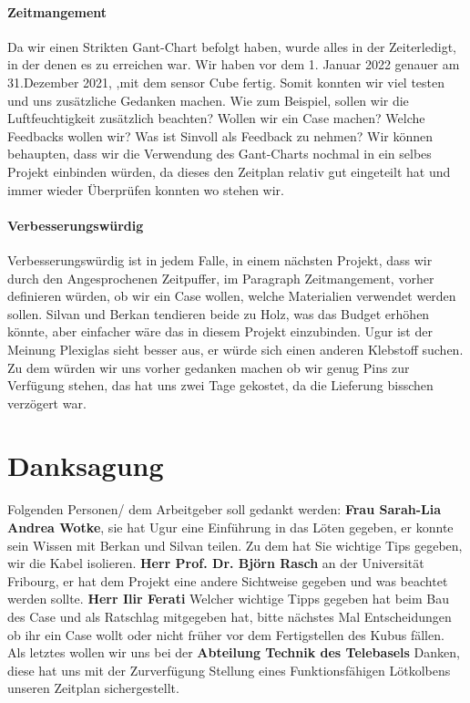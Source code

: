 \documentclass{article}
\newlength\mylength
\begin{document}
\begin{table}
\begin{tabular}{p{\mylength}|p{\mylength}|p{\mylength}}
        \hline
    \end{tabular}
    \label{table: simulation parameters}
\end{table}

\newpage
\paragraph{Zeitmangement}
Da wir einen Strikten Gant-Chart befolgt haben, wurde alles in der Zeiterledigt, in der denen es zu erreichen war. Wir haben vor dem 1. Januar 2022 genauer am 31.Dezember 2021, ,mit dem sensor Cube fertig. Somit konnten wir viel testen und uns zusätzliche Gedanken machen. Wie zum Beispiel, sollen wir die Luftfeuchtigkeit zusätzlich beachten? Wollen wir ein Case machen? Welche Feedbacks wollen wir? Was ist Sinvoll als Feedback zu nehmen? Wir können behaupten, dass wir die Verwendung des Gant-Charts nochmal in ein selbes Projekt einbinden würden, da dieses den Zeitplan relativ gut eingeteilt hat und immer wieder Überprüfen konnten wo stehen wir.  
\paragraph{Verbesserungswürdig}
Verbesserungswürdig ist in jedem Falle, in einem nächsten Projekt, dass wir durch den Angesprochenen Zeitpuffer, im Paragraph Zeitmangement, vorher definieren würden, ob wir ein Case wollen, welche Materialien verwendet werden sollen. Silvan und Berkan tendieren beide zu Holz, was das Budget erhöhen könnte, aber einfacher wäre das in diesem Projekt einzubinden. Ugur ist der Meinung Plexiglas sieht besser aus, er würde sich einen anderen Klebstoff suchen. Zu dem würden wir uns vorher gedanken machen ob wir genug Pins zur Verfügung stehen, das hat uns zwei Tage gekostet, da die Lieferung bisschen verzögert war. 

\section{Danksagung}
Folgenden Personen/ dem Arbeitgeber soll gedankt werden:
\newline \textbf{Frau Sarah-Lia Andrea Wotke}, sie hat Ugur eine Einführung in das Löten gegeben, er konnte sein Wissen mit Berkan und Silvan teilen. Zu dem hat Sie wichtige Tips gegeben, wir die Kabel isolieren. \newline
\textbf{Herr Prof. Dr. Björn Rasch} an der Universität Fribourg, er hat dem Projekt eine andere Sichtweise gegeben und was beachtet werden sollte.\newline
\textbf{Herr Ilir Ferati} Welcher wichtige Tipps gegeben hat beim Bau des Case und als Ratschlag mitgegeben hat, bitte nächstes Mal Entscheidungen ob ihr ein Case wollt oder nicht früher vor dem Fertigstellen des Kubus fällen.\newline
Als letztes wollen wir uns bei der \textbf{Abteilung Technik des Telebasels} Danken, diese hat uns mit der Zurverfügung Stellung eines Funktionsfähigen Lötkolbens unseren Zeitplan sichergestellt.   
\end{document}
